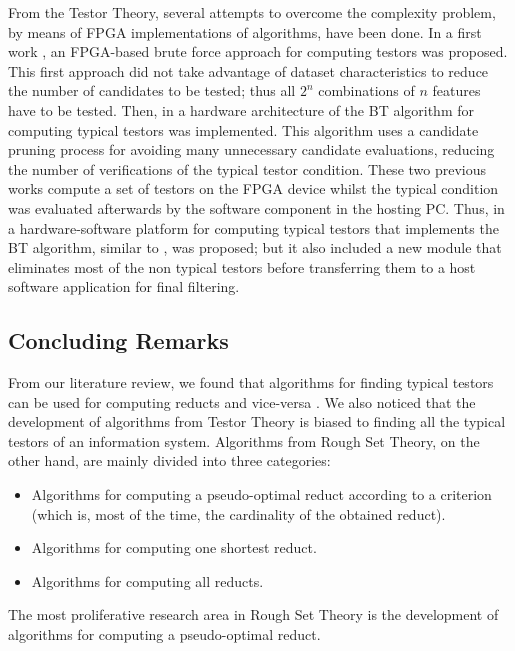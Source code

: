 \documentclass[authoryear,11pt]{elsarticle}
\begin{document}
  From the Testor Theory, several attempts to overcome the complexity problem, by means of FPGA
  implementations of algorithms, have been done. In a first work \citep{Cumplido06}, an 
  FPGA-based brute force approach for computing testors was proposed. This first approach did 
  not take advantage of dataset characteristics to reduce the number of candidates to be tested; 
  thus all $2^n$ combinations of $n$ features have to be tested. Then, in \citep{Rojas07} a hardware 
  architecture of the BT algorithm for computing typical testors was implemented. 
  This algorithm uses a candidate pruning process for avoiding many unnecessary candidate evaluations, 
  reducing the number of verifications of the typical testor condition. These two previous works compute
  a set of testors on the FPGA device whilst the typical condition was evaluated afterwards by the 
  software component in the hosting PC. Thus, in \citep{Rojas12} a hardware-software platform for 
  computing typical testors that implements the BT algorithm, similar to \citep{Rojas07}, was proposed; 
  but it also included a new module that eliminates most of the non typical testors before transferring 
  them to a host software application for final filtering. 
  
\subsection{Concluding Remarks}

  From our literature review, we found that algorithms for finding typical testors can be used for computing 
  reducts and vice-versa \citep{Lazo15}. We also noticed that the development of algorithms from Testor 
  Theory is biased to finding all the typical testors of an information system. Algorithms
  from Rough Set Theory, on the other hand, are mainly divided into three categories:
  \begin{itemize}
	  \item Algorithms for computing a pseudo-optimal reduct according to a criterion (which is, most of the 
	  		time, the cardinality of the obtained reduct).
	  \item Algorithms for computing	one shortest reduct.
	  \item Algorithms for computing	all reducts.
  \end{itemize}
  The most proliferative research area in Rough Set Theory is the development of algorithms for computing a 
  pseudo-optimal reduct. 
  
\end{document}
